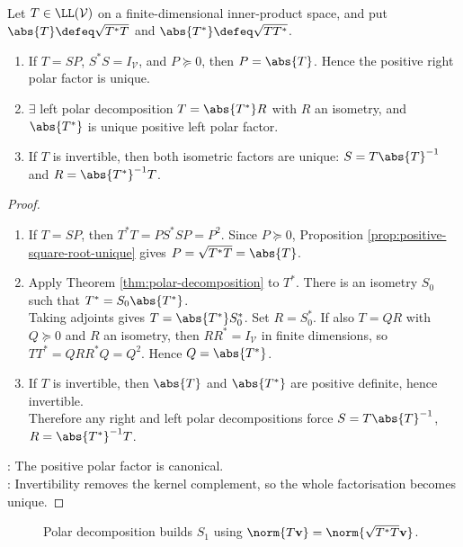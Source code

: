 \begin{corollary} \label{cor:operator-polar-decomposition-uniqueness} \\
Let $T\in\LL(\mathcal{V})$ on a finite-dimensional inner-product space, and put $\abs{T}\defeq\sqrt{T^*T}$ and $\abs{T^*}\defeq\sqrt{TT^*}$.
\begin{enumerate}[label=(\roman*)]
\setlength{\itemsep}{0pt}
\item If $T=SP$, $S^*S=I_{\mathcal{V}}$, and $P\succeq0$, then $P=\abs{T}$. Hence the positive right polar factor is unique.
\item $\exists$ left polar decomposition $T=\abs{T^*}R$ with $R$ an isometry, and $\abs{T^*}$ is unique positive left polar factor.
\item If $T$ is invertible, then both isometric factors are unique:
$S=T\abs{T}^{-1}$ and $R=\abs{T^*}^{-1}T$.
\end{enumerate}
\begin{proof}
\begin{enumerate}[label=(\roman*)]
\setlength{\itemsep}{0pt}
\item If $T=SP$, then $T^*T=P S^*S P=P^2$. Since $P\succeq0$, Proposition \ref{prop:positive-square-root-unique} gives $P=\sqrt{T^*T}=\abs{T}$.
\item Apply Theorem \ref{thm:polar-decomposition} to $T^*$. There is an isometry $S_0$ such that $T^*=S_0\abs{T^*}$.\\
Taking adjoints gives $T=\abs{T^*}S_0^*$. Set $R=S_0^*$. If also $T=QR$ with $Q\succeq0$ and $R$ an isometry, then $RR^*=I_{\mathcal{V}}$ in finite dimensions, so $TT^*=QRR^*Q=Q^2$. Hence $Q=\abs{T^*}$.
\item If $T$ is invertible, then $\abs{T}$ and $\abs{T^*}$ are positive definite, hence invertible.\\
Therefore any right and left polar decompositions force $S=T\abs{T}^{-1}$, $R=\abs{T^*}^{-1}T$.
\end{enumerate}
: The positive polar factor is canonical.\\
: Invertibility removes the kernel complement, so the whole factorisation becomes unique.
\end{proof}
\end{corollary}

\begin{figure}[H]
  \centering
  
  \caption{Polar decomposition builds $S_1$ using $\norm{T\mathbf{v}}=\norm{\sqrt{T^*T}\mathbf{v}}$.}
  \label{fig:polar-decomposition-operator}
\end{figure}


